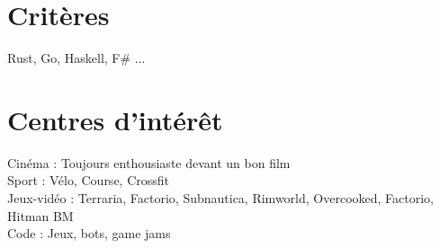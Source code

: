 \documentclass[]{hieudo-build}
\begin{document}
\begin{minipage}[t]{0.34\textwidth}
\section{Critères}
Rust, Go, Haskell, F\# ...  \\ 

\sectionsep




\section{Centres d'intérêt}
Cinéma : Toujours enthousiaste devant un bon film \\
Sport : Vélo, Course, Crossfit \\
Jeux-vidéo : Terraria, Factorio, Subnautica, Rimworld, Overcooked, Factorio, Hitman BM \\
Code : Jeux, bots, game jams


\end{minipage}
\end{document}
